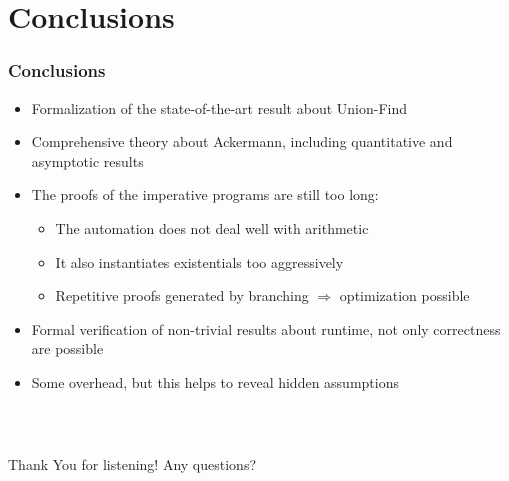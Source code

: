 \section{Conclusions}
\begin{frame}
	\frametitle{Conclusions}
	\begin{itemize}
		\item Formalization of the state-of-the-art result about Union-Find
		\item Comprehensive theory about Ackermann, including quantitative and asymptotic results
		\item The proofs of the imperative programs are still too long:
		 \begin{itemize}
			\item The automation does not deal well with arithmetic
			\item It also instantiates existentials too aggressively
			\item Repetitive proofs generated by branching $\Longrightarrow$ optimization possible
		\end{itemize}
		\item Formal verification of non-trivial results about runtime, not only correctness are possible 
		\item Some overhead, but this helps to reveal hidden assumptions 
	\end{itemize}
\end{frame}

\begin{frame}
\frametitle{\,}
\Huge Thank You for listening! \newline
\Huge Any questions?
\end{frame}

